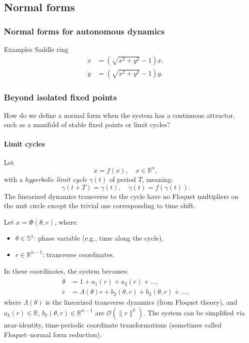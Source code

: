 \documentclass{article}
\theoremstyle{definition} \newtheorem{definition}{Definition}  \newtheorem{example}{Example}
\theoremstyle{remark} \newtheorem{remark}{Remark}
\newcounter{ct}
\begin{document}
\subsection{Normal forms}

\subsubsection{Normal forms for autonomous dynamics}%
Examples
Saddle ring
\begin{equation}
\begin{aligned}
\dot{x} &= (\sqrt{x^2 + y^2} - 1) x, \\
\dot{y} &= (\sqrt{x^2 + y^2} - 1) y.
\end{aligned}
\end{equation}


\subsubsection{Beyond isolated fixed points}
How do we define a normal form when the system has a continuous attractor, such as a manifold of stable fixed points or limit cycles?

\paragraph{Limit cycles}%
Let 
\[
\dot{x} = f(x), \quad x \in \mathbb{R}^n,
\]
with a \emph{hyperbolic limit cycle} \( \gamma(t) \) of period \( T \), meaning:
\[
\gamma(t + T) = \gamma(t), \quad \dot{\gamma}(t) = f(\gamma(t)).
\]
The linearized dynamics transverse to the cycle have no Floquet multipliers on the unit circle except the trivial one corresponding to time shift.

Let \( x = \Phi(\theta, r) \), where: %
\begin{itemize}
  \item \( \theta \in \mathbb{S}^1 \): phase variable (e.g., time along the cycle),
  \item \( r \in \mathbb{R}^{n-1} \): transverse coordinates.
\end{itemize}
In these coordinates, the system becomes:
\[
\begin{aligned}
\dot{\theta} &= 1 + a_1(r) + a_2(r) + \dots, \\
\dot{r} &= \Lambda(\theta) r + b_2(\theta, r) + b_3(\theta, r) + \dots,
\end{aligned}
\]
where \( \Lambda(\theta) \) is the linearized transverse dynamics (from Floquet theory),
and  \( a_k(r) \in \mathbb{R} \), \( b_k(\theta, r) \in \mathbb{R}^{n-1} \) are \( \mathcal{O}(\|r\|^k) \).
The system can be simplified via near-identity, time-periodic coordinate transformations (sometimes called Floquet–normal form reduction).
\end{document}
